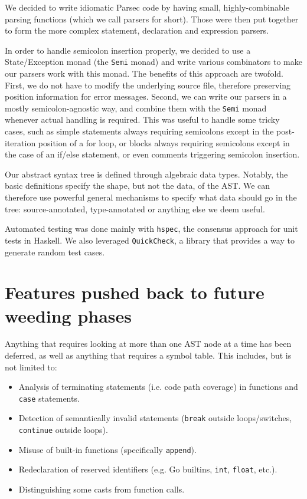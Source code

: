 \documentclass[letterpaper,11pt]{article}
\begin{document}
We decided to write idiomatic Parsec code by having small, highly-combinable parsing functions (which we call parsers for short). Those were then put together to form the more complex statement, declaration and expression parsers.

In order to handle semicolon insertion properly, we decided to use a State/Exception monad (the \texttt{Semi} monad) and write various combinators to make our parsers work with this monad. The benefits of this approach are twofold. First, we do not have to modify the underlying source file, therefore preserving position information for error messages. Second, we can write our parsers in a mostly semicolon-agnostic way, and combine them with the \texttt{Semi} monad whenever actual handling is required. This was useful to handle some tricky cases, such as simple statements always requiring semicolons except in the post-iteration position of a for loop, or blocks always requiring semicolons except in the case of an if/else statement, or even comments triggering semicolon insertion.

Our abstract syntax tree is defined through algebraic data types. Notably, the basic definitions specify the shape, but not the data, of the AST. We can therefore use powerful general mechanisms to specify  what data should go in the tree: source-annotated, type-annotated or anything else we deem useful.

Automated testing was done mainly with \texttt{hspec}, the consensus approach for unit tests in Haskell. We also leveraged \texttt{QuickCheck}, a library that provides a way to generate random test cases.

\section{Features pushed back to future weeding phases}

Anything that requires looking at more than one AST node at a time has been deferred, as well as anything that requires a symbol table. This includes, but is not limited to:
\begin{itemize}
\item Analysis of terminating statements (i.e. code path coverage) in functions and \texttt{case} statements.
\item Detection of semantically invalid statements (\texttt{break} outside loops/switches, \texttt{continue} outside loops).
\item Misuse of built-in functions (specifically \texttt{append}).
\item Redeclaration of reserved identifiers (e.g. Go builtins, \texttt{int}, \texttt{float}, etc.).
\item Distinguishing some casts from function calls.
\end{itemize}
\end{document}
